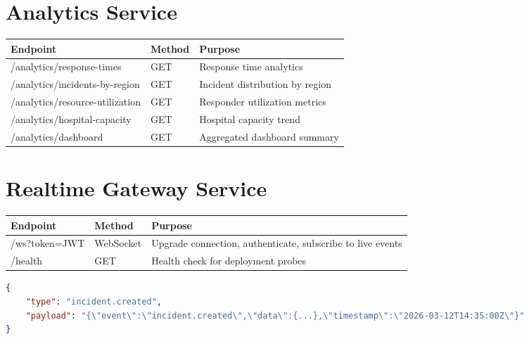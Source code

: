 \documentclass[12pt,a4paper]{report}
\begin{document}
\section{Analytics Service}

\begin{table}[H]
\centering\small
\begin{tabular}{|l|l|p{7cm}|}
\hline
\textbf{Endpoint} & \textbf{Method} & \textbf{Purpose} \\
\hline
/analytics/response-times & GET & Response time analytics \\
\hline
/analytics/incidents-by-region & GET & Incident distribution by region \\
\hline
/analytics/resource-utilization & GET & Responder utilization metrics \\
\hline
/analytics/hospital-capacity & GET & Hospital capacity trend \\
\hline
/analytics/dashboard & GET & Aggregated dashboard summary \\
\hline
\end{tabular}
\end{table}

\section{Realtime Gateway Service}

\begin{table}[H]
\centering\small
\begin{tabular}{|l|l|p{7cm}|}
\hline
\textbf{Endpoint} & \textbf{Method} & \textbf{Purpose} \\
\hline
/ws?token=JWT & WebSocket & Upgrade connection, authenticate, subscribe to live events \\
\hline
/health & GET & Health check for deployment probes \\
\hline
\end{tabular}
\end{table}

\begin{lstlisting}[language=JSON, caption=WebSocket Push Message]
{
	"type": "incident.created",
	"payload": "{\"event\":\"incident.created\",\"data\":{...},\"timestamp\":\"2026-03-12T14:35:00Z\"}"
}
\end{lstlisting}

\newpage

\end{document}
